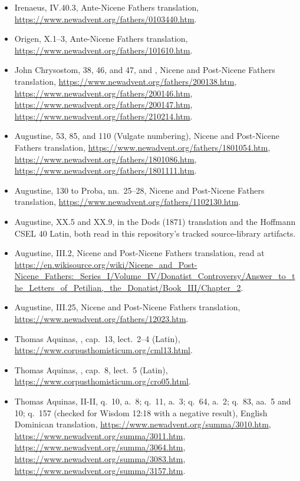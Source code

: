\begin{itemize}
\item Irenaeus,  IV.40.3, Ante-Nicene Fathers
  translation, \url{https://www.newadvent.org/fathers/0103440.htm}.
\item Origen,  X.1--3, Ante-Nicene Fathers
  translation, \url{https://www.newadvent.org/fathers/101610.htm}.
\item John Chrysostom,  38, 46, and 47, and
  , Nicene and Post-Nicene Fathers translation,
  \url{https://www.newadvent.org/fathers/200138.htm},
  \url{https://www.newadvent.org/fathers/200146.htm},
  \url{https://www.newadvent.org/fathers/200147.htm},
  \url{https://www.newadvent.org/fathers/210214.htm}.
\item Augustine,  53, 85, and 110 (Vulgate
  numbering), Nicene and Post-Nicene Fathers translation,
  \url{https://www.newadvent.org/fathers/1801054.htm},
  \url{https://www.newadvent.org/fathers/1801086.htm},
  \url{https://www.newadvent.org/fathers/1801111.htm}.
\item Augustine,  130 to Proba, nn.\ 25--28, Nicene and
  Post-Nicene Fathers translation,
  \url{https://www.newadvent.org/fathers/1102130.htm}.
\item Augustine,  XX.5 and XX.9, in the Dods (1871)
  translation and the Hoffmann CSEL 40 Latin, both read in this repository's
  tracked source-library artifacts.
\item Augustine,  III.2,
  Nicene and Post-Nicene Fathers translation, read at
  \url{https://en.wikisource.org/wiki/Nicene_and_Post-Nicene_Fathers:_Series_I/Volume_IV/Donatist_Controversy/Answer_to_the_Letters_of_Petilian,_the_Donatist/Book_III/Chapter_2}.
\item Augustine,  III.25, Nicene and Post-Nicene
  Fathers translation, \url{https://www.newadvent.org/fathers/12023.htm}.
\item Thomas Aquinas, , cap.\ 13,
  lect.\ 2--4 (Latin), \url{https://www.corpusthomisticum.org/cml13.html}.
\item Thomas Aquinas, , cap.\ 8,
  lect.\ 5 (Latin), \url{https://www.corpusthomisticum.org/cro05.html}.
\item Thomas Aquinas,  II-II, q.\ 10, a.\ 8; q.\ 11,
  a.\ 3; q.\ 64, a.\ 2; q.\ 83, aa.\ 5 and 10; q.\ 157 (checked for Wisdom
  12:18 with a negative result), English Dominican translation,
  \url{https://www.newadvent.org/summa/3010.htm},
  \url{https://www.newadvent.org/summa/3011.htm},
  \url{https://www.newadvent.org/summa/3064.htm},
  \url{https://www.newadvent.org/summa/3083.htm},
  \url{https://www.newadvent.org/summa/3157.htm}.
\end{itemize}

